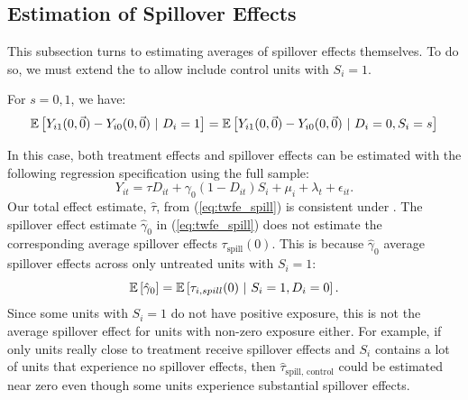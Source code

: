 \documentclass[11pt]{article}
\begin{document}
\subsection{Estimation of Spillover Effects}\label{sec:spill}

This subsection turns to estimating averages of spillover effects themselves. To do so, we must extend the  to allow include control units with $S_i = 1$. 
\begin{assumption}\label{assumption:parallel-spill}
  For $s = 0, 1$, we have: 
  \[
      \mathbb{E}\left[Y_{i1}(0, \vec{0}) - Y_{i0}(0, \vec{0}) \ \vert \ D_i = 1\right] = 
      \mathbb{E}\left[Y_{i1}(0, \vec{0}) - Y_{i0}(0, \vec{0}) \ \vert \ D_i = 0, S_i = s\right]
  \]
\end{assumption}

In this case, both treatment effects and spillover effects can be estimated with the following regression specification using the full sample:
\begin{equation}\label{eq:twfe_spill}
  Y_{it} = \tau D_{it} + \gamma_0 (1 - D_{it}) S_i + \mu_i + \lambda_t + \epsilon_{it}.
\end{equation}
Our total effect estimate, $\hat{\tau}$, from (\ref{eq:twfe_spill}) is consistent under . The spillover effect estimate $\hat{\gamma}_0$ in (\ref{eq:twfe_spill}) does not estimate the corresponding average spillover effects $\tau_{\text{spill}}(0)$. This is because $\hat{\gamma}_0$ average spillover effects across only untreated units with $S_i = 1$:
\[ 
    \mathbb{E}\left[\hat{\gamma}_0\right] = \mathbb{E}\left[\tau_{i, spill}(0) \ \vert \  S_i = 1, D_i = 0\right].
\]
Since some units with $S_i = 1$ do not have positive exposure, this is not the average spillover effect for units with non-zero exposure either. For example, if only units really close to treatment receive spillover effects and $S_i$ contains a lot of units that experience no spillover effects, then $\hat{\tau}_{\text{spill, control}}$ could be estimated near zero even though some units experience substantial spillover effects.
\end{document}
